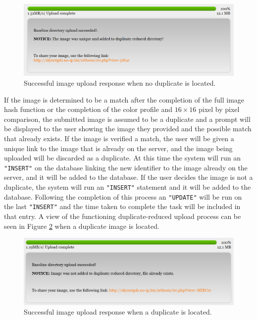 \begin{figure}[htbp]
\centering
\includegraphics[width=5.5in]{success_nodupfound}
\caption{Successful image upload response when no duplicate is located.}
\label{success_nodupfound}
\end{figure}

If the image is determined to be a match after the completion of the full image hash function or the completion of the color profile and $16\times16$ pixel by pixel comparison, the submitted image is assumed to be a duplicate and a prompt will be displayed to the user showing the image they provided and the possible match that already exists. If the image is verified a match, the user will be given a unique link to the image that is already on the server, and the image being uploaded will be discarded as a duplicate. At this time the system will run an {\tt "INSERT"} on the database linking the new identifier to the image already on the server, and it will be added to the database. If the user decides the image is not a duplicate, the system will run an {\tt "INSERT"} statement and it will be added to the database. Following the completion of this process an {\tt "UPDATE"} will be run on the last {\tt "INSERT"} and the time taken to complete the task will be included in that entry. A view of the functioning duplicate-reduced upload process can be seen in Figure \ref{success_dupfound} when a duplicate image is located.

\begin{figure}[htbp]
\centering
\includegraphics[width=5.5in]{success_dupfound}
\caption{Successful image upload response when a duplicate is located.}
\label{success_dupfound}
\end{figure}

